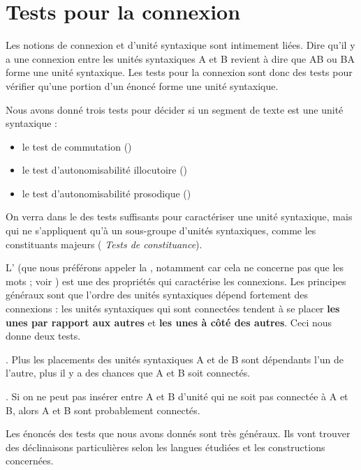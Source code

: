 \section{Tests pour la connexion}\label{sec:3.2.16}

Les notions de connexion et d’unité syntaxique sont intimement liées. Dire qu’il y a une connexion entre les unités syntaxiques A et B revient à dire que AB ou BA forme une unité syntaxique. Les tests pour la connexion sont donc des tests pour vérifier qu’une portion d’un énoncé forme une unité syntaxique.

Nous avons donné trois tests pour décider si un segment de texte est une unité syntaxique :

\begin{itemize}
\item le test de commutation ()
\item le test d’autonomisabilité illocutoire ()
\item le test d’autonomisabilité prosodique ()
\end{itemize}

On verra dans le  des tests suffisants pour caractériser une unité syntaxique, mais qui ne s’appliquent qu’à un sous-groupe d’unités syntaxiques, comme les constituants majeurs ( \textit{Tests de constituance}).

L’ (que nous préférons appeler la , notamment car cela ne concerne pas que les mots ; voir ) est une des propriétés qui caractérise les connexions. Les principes généraux sont que l’ordre des unités syntaxiques dépend fortement des connexions : les unités syntaxiques qui sont connectées tendent à se placer \textbf{les unes par rapport aux autres} et \textbf{les unes à côté des autres}. Ceci nous donne deux tests.

{. Plus les placements des unités syntaxiques A et de B sont dépendants l’un de l’autre, plus il y a des chances que A et B soit connectés.}

{. Si on ne peut pas insérer entre A et B d’unité qui ne soit pas connectée à A et B, alors A et B sont probablement connectés.}

Les énoncés des tests que nous avons donnés sont très généraux. Ils vont trouver des déclinaisons particulières selon les langues étudiées et les constructions concernées.

